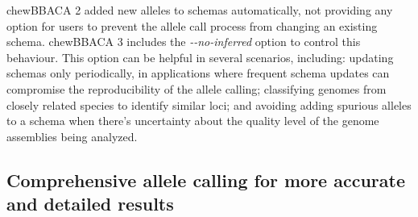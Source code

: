 chewBBACA 2 added new alleles to schemas automatically, not providing any option for users to prevent the allele call process from changing an existing schema. chewBBACA 3 includes the \textit{-{}-no-inferred} option to control this behaviour. This option can be helpful in several scenarios, including: updating schemas only periodically, in applications where frequent schema updates can compromise the reproducibility of the allele calling; classifying genomes from closely related species to identify similar loci; and avoiding adding spurious alleles to a schema when there's uncertainty about the quality level of the genome assemblies being analyzed.

\subsection{Comprehensive allele calling for more accurate and detailed results} \label{ssec:results_discussion_ssec3}

